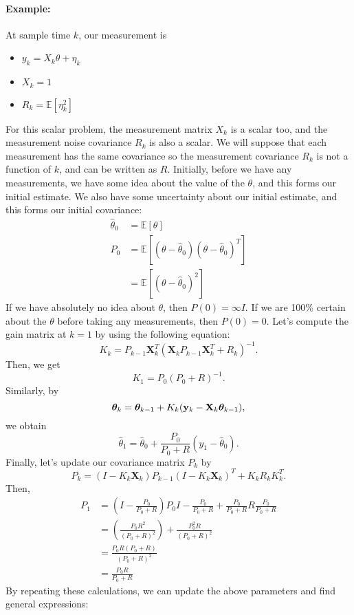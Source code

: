 \paragraph{Example: }
At sample time $k$, our measurement is
\begin{itemize}
	\item $y_k = X_k\theta+\eta_k$
	\item $X_k = 1$
	\item $R_k = \mathbb{E}[\eta_k^2]$
\end{itemize}
For this scalar problem, the measurement matrix $X_k$ is a scalar too, and the measurement noise covariance $R_k$ is also a scalar. We will suppose that each measurement has the same covariance so the measurement covariance $R_k$ is not a function of $k$, and can be written as $R$. Initially, before we have any measurements, we have some idea about the value of the $\theta$, and this forms our initial estimate. We also have some uncertainty about our initial estimate, and this forms our initial covariance:
\begin{align*}
	\hat{\theta}_0 &= \mathbb{E}[\theta]\\
	P_0 &= \mathbb{E}[(\theta-\hat{\theta}_0)(\theta-\hat{\theta}_0)^T]\\
		&= \mathbb{E}[(\theta-\hat{\theta}_0)^2]
\end{align*}
If we have absolutely no idea about $\theta$, then $P(0)=\infty I$. If we are 100\% certain about the $\theta$ before taking any measurements, then $P(0)=0$. Let's compute the gain matrix at $k=1$ by using the following equation:
$$K_k = P_{k-1}\mathbf{X}_k^T(\mathbf{X}_kP_{k-1}\mathbf{X}_k^T+R_k)^{-1}.$$
Then, we get
$$K_1 = P_{0}(P_{0}+R)^{-1}.$$
Similarly, by
$$\boldsymbol{\theta}_k = \boldsymbol{\theta}_{k-1}+K_k ({\mathbf{y}}_k-\mathbf{X}_k\boldsymbol{\theta}_{k-1}),$$
we obtain
$$\hat{\theta}_1 = \hat{\theta}_{0}+\frac{P_{0}}{P_{0}+R} (y_1-\hat{\theta}_{0}).$$
Finally, let's update our covariance matrix $P_k$ by 
$$P_k = (I-K_k \mathbf{X}_k)P_{k-1}(I-K_k \mathbf{X}_k)^T+K_kR_kK_k^T.$$
Then, 
\begin{align*}
	P_1 &= \left(I-\frac{P_{0}}{P_{0}+R}\right)P_{0}I-\frac{P_{0}}{P_{0}+R}+\frac{P_{0}}{P_{0}+R}R\frac{P_{0}}{P_{0}+R}\\
		&= \left(\frac{P_0R^2}{(P_{0}+R)^2}\right)+\frac{P_{0}^2R}{(P_{0}+R)^2}\\
		&= \frac{P_{0}R(P_0+R)}{(P_{0}+R)^2}\\
		&= \frac{P_{0}R}{P_{0}+R}
\end{align*}
By repeating these calculations, we can update the above parameters and find general expressions: 
